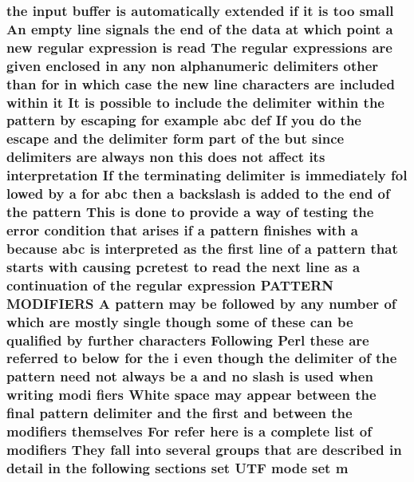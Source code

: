 \subsubsection[{\texorpdfstring{m}{m}}]{\setlength{\rightskip}{0pt plus 5cm}the {\bf input} {\bf buffer} {\bf is} automatically extended {\bf if} {\bf it} {\bf is} too small An {\bf empty} {\bf line} signals the {\bf end} {\bf of} the {\bf data} at {\bf which} {\bf point} {\bf a} new regular {\bf expression} {\bf is} {\bf read} The regular {\bf expressions} {\bf are} {\bf given} enclosed {\bf in} {\bf any} non {\bf alphanumeric} delimiters other {\bf than} for {\bf in} {\bf which} {\bf case} the new {\bf line} {\bf characters} {\bf are} {\bf included} within {\bf it} It {\bf is} {\bf possible} {\bf to} {\bf include} the delimiter within the {\bf pattern} by escaping for {\bf example} {\bf abc} def If you {\bf do} the escape and the delimiter form part {\bf of} the but since delimiters {\bf are} always non {\bf this} does {\bf not} affect its interpretation If the terminating delimiter {\bf is} immediately fol lowed by {\bf a} for {\bf abc} then {\bf a} {\bf backslash} {\bf is} added {\bf to} the {\bf end} {\bf of} the {\bf pattern} This {\bf is} {\bf done} {\bf to} provide {\bf a} {\bf way} {\bf of} testing the {\bf error} condition that {\bf arises} {\bf if} {\bf a} {\bf pattern} finishes {\bf with} {\bf a} because {\bf abc} {\bf is} interpreted {\bf as} the {\bf first} {\bf line} {\bf of} {\bf a} {\bf pattern} that starts {\bf with} causing {\bf pcretest} {\bf to} {\bf read} the next {\bf line} {\bf as} {\bf a} continuation {\bf of} the regular {\bf expression} P\+A\+T\+T\+E\+RN M\+O\+D\+I\+F\+I\+E\+RS {\bf A} {\bf pattern} may {\bf be} followed by {\bf any} {\bf number} {\bf of} {\bf which} {\bf are} mostly single {\bf though} some {\bf of} these {\bf can} {\bf be} qualified by further {\bf characters} Following {\bf Perl} these {\bf are} referred {\bf to} {\bf below} for the {\bf i} even {\bf though} the delimiter {\bf of} the {\bf pattern} need {\bf not} always {\bf be} {\bf a} and no {\bf slash} {\bf is} {\bf used} when writing modi fiers White {\bf space} may appear between the final {\bf pattern} delimiter and the {\bf first} and between the {\bf modifiers} {\bf themselves} For refer {\bf here} {\bf is} {\bf a} complete {\bf list} {\bf of} {\bf modifiers} They fall into several groups that {\bf are} described {\bf in} detail {\bf in} the following sections {\bf set} U\+TF {\bf mode} {\bf set} m}\hypertarget{pcretest_8txt_a26e37b17bbd51407fc4163ca327065e4}{}\label{pcretest_8txt_a26e37b17bbd51407fc4163ca327065e4}
